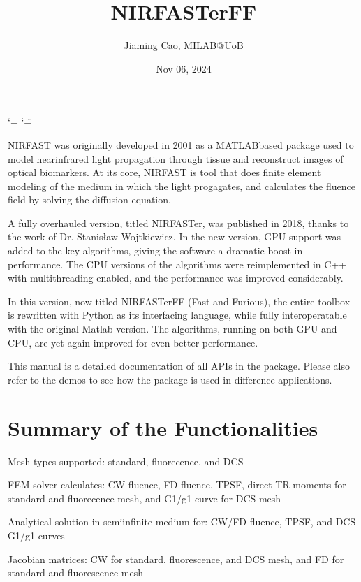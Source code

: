 \documentclass[letterpaper,10pt,english]{sphinxmanual}
\title{NIRFASTerFF}
\date{Nov 06, 2024}
\author{Jiaming Cao, MILAB@UoB}
\begin{document}
\ifdefined\shorthandoff
  \ifnum\catcode`\=\string=\active\shorthandoff{=}\fi
  \ifnum\catcode`\"=\active{}\fi
\fi

\pagestyle{empty}
\sphinxmaketitle
\pagestyle{plain}
\sphinxtableofcontents
\pagestyle{normal}
\label{\detokenize{index::doc}}


\sphinxAtStartPar
NIRFAST was originally developed in 2001 as a MATLAB\sphinxhyphen{}based package used to model near\sphinxhyphen{}infrared light propagation through tissue and reconstruct images of optical biomarkers. At its core, NIRFAST is tool that does finite element modeling of the medium in which the light progagates, and calculates the fluence field by solving the diffusion equation.

\sphinxAtStartPar
A fully overhauled version, titled NIRFASTer, was published in 2018, thanks to the work of Dr. Stanisław Wojtkiewicz. In the new version, GPU support was added to the key algorithms, giving the software a dramatic boost in performance. The CPU versions of the algorithms were re\sphinxhyphen{}implemented in C++ with multithreading enabled, and the performance was improved considerably.

\sphinxAtStartPar
In this version, now titled NIRFASTerFF (Fast and Furious), the entire toolbox is re\sphinxhyphen{}written with Python as its interfacing language, while fully inter\sphinxhyphen{}operatable with the original Matlab version. The algorithms, running on both GPU and CPU, are yet again improved for even better performance.

\sphinxAtStartPar
This manual is a detailed documentation of all APIs in the package. Please also refer to the demos to see how the package is used in difference applications.


\chapter{Summary of the Functionalities}
\label{\detokenize{index:summary-of-the-functionalities}}
\sphinxAtStartPar
Mesh types supported: standard, fluorecence, and DCS

\sphinxAtStartPar
FEM solver calculates: CW fluence, FD fluence, TPSF, direct TR moments for standard and fluorecence mesh, and G1/g1 curve for DCS mesh

\sphinxAtStartPar
Analytical solution in semi\sphinxhyphen{}infinite medium for: CW/FD fluence, TPSF, and DCS G1/g1 curves

\sphinxAtStartPar
Jacobian matrices: CW for standard, fluorescence, and DCS mesh, and FD for standard and fluorescence mesh
\end{document}

